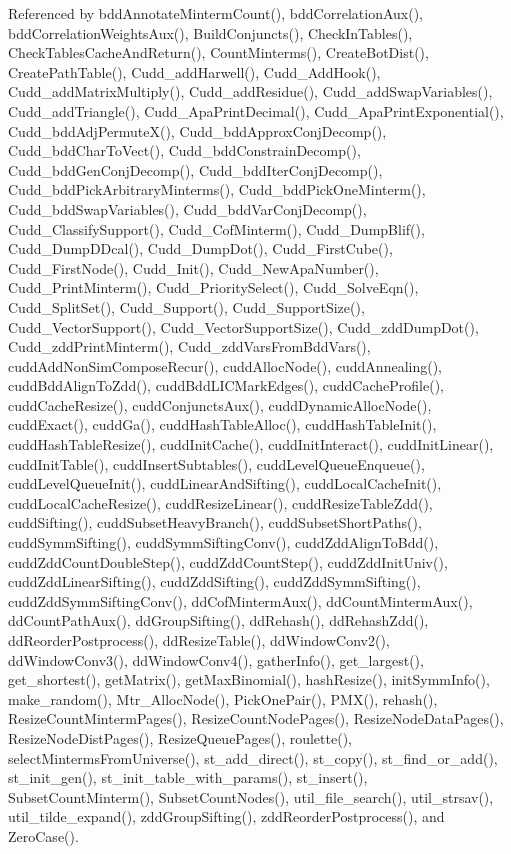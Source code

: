 Referenced by bdd\-Annotate\-Minterm\-Count(), bdd\-Correlation\-Aux(), bdd\-Correlation\-Weights\-Aux(), Build\-Conjuncts(), Check\-In\-Tables(), Check\-Tables\-Cache\-And\-Return(), Count\-Minterms(), Create\-Bot\-Dist(), Create\-Path\-Table(), Cudd\_\-add\-Harwell(), Cudd\_\-Add\-Hook(), Cudd\_\-add\-Matrix\-Multiply(), Cudd\_\-add\-Residue(), Cudd\_\-add\-Swap\-Variables(), Cudd\_\-add\-Triangle(), Cudd\_\-Apa\-Print\-Decimal(), Cudd\_\-Apa\-Print\-Exponential(), Cudd\_\-bdd\-Adj\-Permute\-X(), Cudd\_\-bdd\-Approx\-Conj\-Decomp(), Cudd\_\-bdd\-Char\-To\-Vect(), Cudd\_\-bdd\-Constrain\-Decomp(), Cudd\_\-bdd\-Gen\-Conj\-Decomp(), Cudd\_\-bdd\-Iter\-Conj\-Decomp(), Cudd\_\-bdd\-Pick\-Arbitrary\-Minterms(), Cudd\_\-bdd\-Pick\-One\-Minterm(), Cudd\_\-bdd\-Swap\-Variables(), Cudd\_\-bdd\-Var\-Conj\-Decomp(), Cudd\_\-Classify\-Support(), Cudd\_\-Cof\-Minterm(), Cudd\_\-Dump\-Blif(), Cudd\_\-Dump\-DDcal(), Cudd\_\-Dump\-Dot(), Cudd\_\-First\-Cube(), Cudd\_\-First\-Node(), Cudd\_\-Init(), Cudd\_\-New\-Apa\-Number(), Cudd\_\-Print\-Minterm(), Cudd\_\-Priority\-Select(), Cudd\_\-Solve\-Eqn(), Cudd\_\-Split\-Set(), Cudd\_\-Support(), Cudd\_\-Support\-Size(), Cudd\_\-Vector\-Support(), Cudd\_\-Vector\-Support\-Size(), Cudd\_\-zdd\-Dump\-Dot(), Cudd\_\-zdd\-Print\-Minterm(), Cudd\_\-zdd\-Vars\-From\-Bdd\-Vars(), cudd\-Add\-Non\-Sim\-Compose\-Recur(), cudd\-Alloc\-Node(), cudd\-Annealing(), cudd\-Bdd\-Align\-To\-Zdd(), cudd\-Bdd\-LICMark\-Edges(), cudd\-Cache\-Profile(), cudd\-Cache\-Resize(), cudd\-Conjuncts\-Aux(), cudd\-Dynamic\-Alloc\-Node(), cudd\-Exact(), cudd\-Ga(), cudd\-Hash\-Table\-Alloc(), cudd\-Hash\-Table\-Init(), cudd\-Hash\-Table\-Resize(), cudd\-Init\-Cache(), cudd\-Init\-Interact(), cudd\-Init\-Linear(), cudd\-Init\-Table(), cudd\-Insert\-Subtables(), cudd\-Level\-Queue\-Enqueue(), cudd\-Level\-Queue\-Init(), cudd\-Linear\-And\-Sifting(), cudd\-Local\-Cache\-Init(), cudd\-Local\-Cache\-Resize(), cudd\-Resize\-Linear(), cudd\-Resize\-Table\-Zdd(), cudd\-Sifting(), cudd\-Subset\-Heavy\-Branch(), cudd\-Subset\-Short\-Paths(), cudd\-Symm\-Sifting(), cudd\-Symm\-Sifting\-Conv(), cudd\-Zdd\-Align\-To\-Bdd(), cudd\-Zdd\-Count\-Double\-Step(), cudd\-Zdd\-Count\-Step(), cudd\-Zdd\-Init\-Univ(), cudd\-Zdd\-Linear\-Sifting(), cudd\-Zdd\-Sifting(), cudd\-Zdd\-Symm\-Sifting(), cudd\-Zdd\-Symm\-Sifting\-Conv(), dd\-Cof\-Minterm\-Aux(), dd\-Count\-Minterm\-Aux(), dd\-Count\-Path\-Aux(), dd\-Group\-Sifting(), dd\-Rehash(), dd\-Rehash\-Zdd(), dd\-Reorder\-Postprocess(), dd\-Resize\-Table(), dd\-Window\-Conv2(), dd\-Window\-Conv3(), dd\-Window\-Conv4(), gather\-Info(), get\_\-largest(), get\_\-shortest(), get\-Matrix(), get\-Max\-Binomial(), hash\-Resize(), init\-Symm\-Info(), make\_\-random(), Mtr\_\-Alloc\-Node(), Pick\-One\-Pair(), PMX(), rehash(), Resize\-Count\-Minterm\-Pages(), Resize\-Count\-Node\-Pages(), Resize\-Node\-Data\-Pages(), Resize\-Node\-Dist\-Pages(), Resize\-Queue\-Pages(), roulette(), select\-Minterms\-From\-Universe(), st\_\-add\_\-direct(), st\_\-copy(), st\_\-find\_\-or\_\-add(), st\_\-init\_\-gen(), st\_\-init\_\-table\_\-with\_\-params(), st\_\-insert(), Subset\-Count\-Minterm(), Subset\-Count\-Nodes(), util\_\-file\_\-search(), util\_\-strsav(), util\_\-tilde\_\-expand(), zdd\-Group\-Sifting(), zdd\-Reorder\-Postprocess(), and Zero\-Case().
